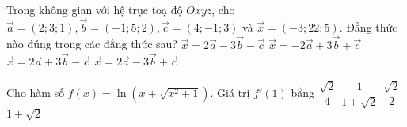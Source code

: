 \begin{ex}%
	Trong không gian với hệ trục toạ độ $Oxyz$, cho $\vec{a}=\left(2;3;1\right), \vec{b}=\left(-1;5;2\right), \vec{c}=\left(4;-1;3\right)$ và $\vec{x}=\left(-3;22;5\right)$. Đẳng thức nào đúng trong các đẳng thức sau?
	\choice
	{$\vec {x}=2\vec {a}-3\vec {b}-\vec {c}$}
	{$\vec {x}=-2\vec {a}+3\vec {b}+\vec {c}$}
	{\True $\vec {x}=2\vec {a}+3\vec {b}-\vec {c}$}
	{$\vec {x}=2\vec {a}-3\vec {b}+\vec {c}$}
	
\end{ex}
\begin{ex}%
	Cho hàm số $f(x)=\ln \left(x+\sqrt{x^2+1}\right)$. Giá trị $f'(1)$ bằng
	\choice
	{$\dfrac{\sqrt{2}}{4}$}
	{$\dfrac{1}{1+\sqrt{2}}$}
	{\True $\dfrac{\sqrt{2}}{2}$}
	{$1+\sqrt{2}$}
\end{ex}
